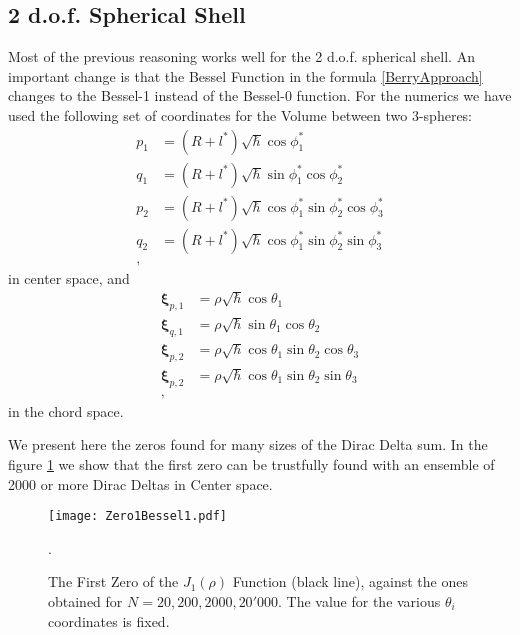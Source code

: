\documentclass[a4paper,12pt]{article}
\newcommand{\xifase}{ {\boldsymbol{\xi}} }
\begin{document}
\subsection{2 d.o.f. Spherical Shell}

Most of the previous reasoning works well for 
the 2 d.o.f. spherical shell. An important 
change is that the Bessel Function in the formula
\ref{BerryApproach} changes to the Bessel-1 instead
of the Bessel-0 function. 
For the numerics we have used the following
set of coordinates for the Volume between two 
3-spheres: 
\begin{equation}\label{4ballcordinates1}
\begin{split}
p_1&=(R+l^*)\sqrt{\hbar}\cos \phi_1^* \\
q_1&=(R+l^*)\sqrt{\hbar}\sin \phi_1^* \cos\phi_2^*\\
p_2&=(R+l^*)\sqrt{\hbar}\cos \phi_1^*\sin\phi_2^*\cos\phi_3^* \\
q_2&=(R+l^*)\sqrt{\hbar}\cos \phi_1^* \sin\phi_2^*\sin\phi_3^* \\,
\end{split}
\end{equation}
in center space, and 
\begin{equation}\label{4ballcordinates2}
\begin{split}
\xifase_{p,1}&= \rho\sqrt{\hbar}\cos \theta_1 \\
\xifase_{q,1}&= \rho\sqrt{\hbar}\sin \theta_1 \cos\theta_2\\
\xifase_{p,2}&= \rho\sqrt{\hbar}\cos \theta_1\sin\theta_2\cos\theta_3 \\
\xifase_{p,2}&= \rho\sqrt{\hbar}\cos \theta_1 \sin\theta_2\sin\theta_3 \\,
\end{split}
\end{equation}
in the chord space.

We present here the zeros found for many sizes of
the Dirac Delta sum. In the figure \ref{ZerosContraPrecision}
we show that the first zero can be trustfully found with an
ensemble of 2000 or more Dirac Deltas in Center space.

\begin{figure}
\begin{center}
  \texttt{[image: Zero1Bessel1.pdf]}
\caption{The First Zero of the $J_1(\rho)$ Function (black line),
  against the ones obtained for $N=20,200,2000, 20'000$. The
value for the various $\theta_i$ coordinates is fixed. }
\label{ZerosContraPrecision}.
\end{center}
\end{figure}
\end{document}
